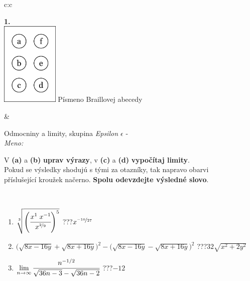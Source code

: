 \documentclass[10pt]{report}
\begin{document}
\begin{tabular}{c:c}
\begin{minipage}[c][104.5mm][t]{0.5\linewidth}
\begin{center}
\begin{minipage}{0.20\linewidth}
\begin{center}
{\Huge\bfseries 1.} \\[2mm]
\includegraphics[height=40mm]{../images/braille.png}
{\small Písmeno Braillovej abecedy}
\end{center}
\end{minipage}
\end{center}
\end{minipage}
&
\begin{minipage}[c][104.5mm][t]{0.5\linewidth}
\begin{center}
\vspace{7mm}
{\huge Odmocniny a limity, skupina \textit{Epsilon $\epsilon$} -}\\[5mm]
\textit{Meno:}\phantom{xxxxxxxxxxxxxxxxxxxxxxxxxxxxxxxxxxxxxxxxxxxxxxxxxxxxxxxxxxxxxxxxx}\\[5mm]
\begin{minipage}{0.95\linewidth}
\begin{center}
V \textbf{(a)} a \textbf{(b)} \textbf{uprav výrazy}, v \textbf{(c)} a \textbf{(d)} \textbf{vypočítaj limity}.\\Pokud se výsledky shodujú s tými za otazníky, tak napravo obarvi\\příslušející kroužek načerno. \textbf{Spolu odevzdejte výsledné slovo}.
\end{center}
\end{minipage}
\\[1mm]
\begin{minipage}{0.79\linewidth}
\begin{center}
\begin{varwidth}{\linewidth}
\begin{enumerate}
\small
\item $\sqrt[3]{\left(\cfrac{x^{1}\;x^{-1}}{x^{\nicefrac{2}{9}}}\right)^{5}}$\quad \dotfill\; ???\;\dotfill \quad $x^{\nicefrac{-10}{27}}$
\item {\footnotesize{\scriptsize$\big(\sqrt{8x-16y}+\sqrt{8x+16y}\big)^2-\big(\sqrt{8x-16y}-\sqrt{8x+16y}\big)^2$}\quad \dotfill\; ???\;\dotfill \quad $32\sqrt{x^2+2y^2}$}
\item $\lim\limits_{n\to\infty}\cfrac{n^{-1/2}}{\sqrt{36n-3}-\sqrt{36n-2}}$\quad \dotfill\; ???\;\dotfill \quad $-12$

\end{enumerate}
\end{varwidth}
\end{center}
\end{minipage}
\end{center}
\end{minipage}
\end{tabular}
\end{document}
